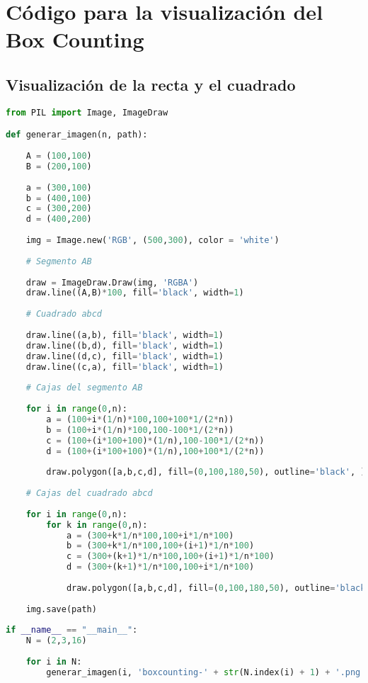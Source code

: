 \chapter{Código para la visualización del Box Counting}

\section{Visualización de la recta y el cuadrado}

\begin{lstlisting}[language=Python]
from PIL import Image, ImageDraw

def generar_imagen(n, path):
        
    A = (100,100)
    B = (200,100)
    
    a = (300,100)
    b = (400,100)
    c = (300,200)
    d = (400,200)
        
    img = Image.new('RGB', (500,300), color = 'white')
        
    # Segmento AB
        
    draw = ImageDraw.Draw(img, 'RGBA')
    draw.line((A,B)*100, fill='black', width=1)
        
    # Cuadrado abcd
        
    draw.line((a,b), fill='black', width=1)
    draw.line((b,d), fill='black', width=1)
    draw.line((d,c), fill='black', width=1)
    draw.line((c,a), fill='black', width=1)
    
    # Cajas del segmento AB
    
    for i in range(0,n):
        a = (100+i*(1/n)*100,100+100*1/(2*n))
        b = (100+i*(1/n)*100,100-100*1/(2*n))
        c = (100+(i*100+100)*(1/n),100-100*1/(2*n))
        d = (100+(i*100+100)*(1/n),100+100*1/(2*n))
            
        draw.polygon([a,b,c,d], fill=(0,100,180,50), outline='black', )
        
    # Cajas del cuadrado abcd
        
    for i in range(0,n):
        for k in range(0,n):
            a = (300+k*1/n*100,100+i*1/n*100)
            b = (300+k*1/n*100,100+(i+1)*1/n*100)
            c = (300+(k+1)*1/n*100,100+(i+1)*1/n*100)
            d = (300+(k+1)*1/n*100,100+i*1/n*100)
                
            draw.polygon([a,b,c,d], fill=(0,100,180,50), outline='black')
                
    img.save(path)
        
if __name__ == "__main__":
    N = (2,3,16)
        
    for i in N:
        generar_imagen(i, 'boxcounting-' + str(N.index(i) + 1) + '.png')        
\end{lstlisting}

